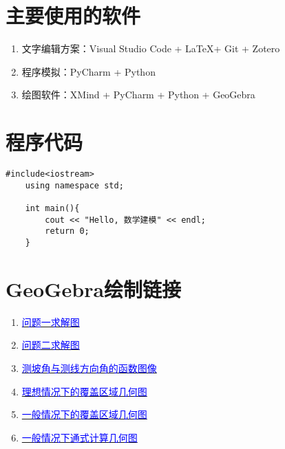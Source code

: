 


\nocite{*}


\appendix
\section{主要使用的软件}

\begin{enumerate}
    \item 文字编辑方案：Visual Studio Code + \LaTeX + Git + Zotero
    \item 程序模拟：PyCharm + Python
    \item 绘图软件：XMind + PyCharm + Python + GeoGebra
\end{enumerate}

\section{程序代码}

\begin{lstlisting}[caption={类的定义语句}]
    #include<iostream>
    using namespace std;

    int main(){
        cout << "Hello, 数学建模" << endl;
        return 0;
    }
\end{lstlisting}

\section{GeoGebra绘制链接}

\begin{enumerate}
    \item \href{https://www.geogebra.org/m/hpkkarys}{\textcolor{blue}{问题一求解图}}
    \item \href{https://www.geogebra.org/m/f6kfjvru}{\textcolor{blue}{问题二求解图}}
    \item \href{https://www.geogebra.org/m/n8saurfn}{\textcolor{blue}{测坡角与测线方向角的函数图像}}
    \item \href{https://www.geogebra.org/m/xcvstdzg}{\textcolor{blue}{理想情况下的覆盖区域几何图}}
    \item \href{https://www.geogebra.org/m/absuxwpk}{\textcolor{blue}{一般情况下的覆盖区域几何图}}
    \item \href{https://www.geogebra.org/m/tfajj8mz}{\textcolor{blue}{一般情况下通式计算几何图}}
\end{enumerate}
